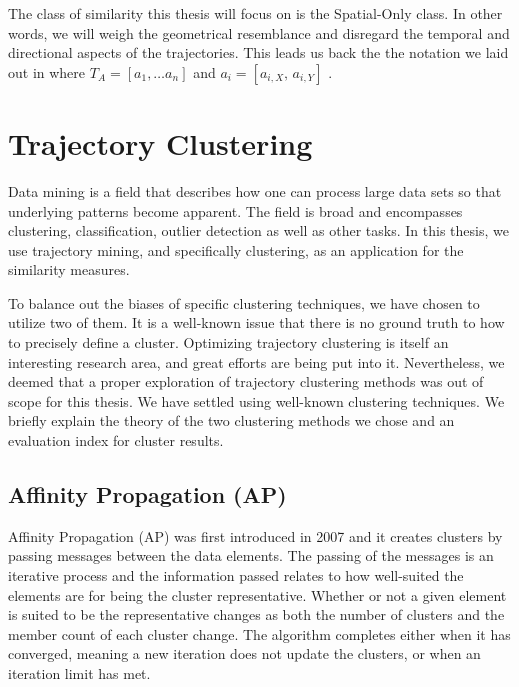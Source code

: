\clearpage
The class of similarity this thesis will focus on is the Spatial-Only class.
In other words, we will weigh the geometrical resemblance and disregard the temporal and directional aspects of the trajectories.
This leads us back the the notation we laid out in  where $T_A = [a_1, \dotsc a_n]$ and $a_i = [ a_{i,X}, \, a_{i, Y} ]$ . 




\section{Trajectory Clustering}
\label{sec:traj-mining}
Data mining is a field that describes how one can process large data sets so that underlying patterns become apparent. The field is broad and encompasses clustering, classification, outlier detection as well as other tasks\cite{81-DataMining}.
In this thesis, we use trajectory mining, and specifically clustering, as an application for the similarity measures. 



To balance out the biases of specific clustering techniques, we have chosen to utilize two of them. 
It is a well-known issue that there is no ground truth to how to precisely define a cluster\cite{64-WhyMany}.
Optimizing trajectory clustering is itself an interesting research area, and great efforts are being put into it\cite{82-BigTrajectory,69-MiningSpatial}.
Nevertheless, we deemed that a proper exploration of trajectory clustering methods was out of scope for this thesis.
We have settled using well-known clustering techniques. 
We briefly explain the theory of the two clustering methods we chose and an evaluation index for cluster results.



 
 \subsection{Affinity Propagation (AP) }
Affinity Propagation (AP) was first introduced in 2007 and it creates clusters by passing messages between the data elements\cite{60-ClusteringPassing}.
The passing of the messages is an iterative process and the information passed relates to how well-suited the elements are for being the cluster representative. 
Whether or not a given element is suited to be the representative changes as both the number of clusters and the member count of each cluster change. 
The algorithm completes either when it has converged, meaning a new iteration does not update the clusters, or when an iteration limit has met. 

